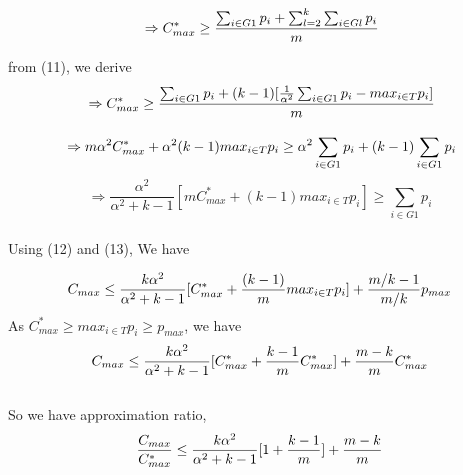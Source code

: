 \documentclass[10pt, conference, compsocconf]{IEEEtran}
\begin{document}
\begin{equation}
{\nonumber}\Rightarrow C_{max}^{*} \geq  \frac{\sum_{i \in G1 }^{}{{p_{i}}}+ \sum_{l=2}^{k}\sum_{i \in Gl }^{}{{p_{i}}}}{m}
\end{equation}




from (11), we derive\\

\begin{equation}{\nonumber}
\Rightarrow C_{max}^{*} \geq  \frac{\sum_{i \in G1 }^{}{{p_{i}}}+ (k-1)[\frac{1}{\alpha^{2}}\sum_{i \in G1 }^{}{{p_{i}}}-  {max_{i \in T}}{{p_{i}}}]}{m}
\end{equation}

\begin{equation}{\nonumber}
\Rightarrow m\alpha^{2}C_{max}^{*} + \alpha^{2} (k-1){max_{i \in T}}{{p_{i}}} \geq  \alpha^{2}\sum_{i \in G1 }^{}{{p_{i}}}+ (k-1)\sum_{i \in G1 }^{}{{p_{i}}} 
\end{equation}
\begin{equation}
\Rightarrow\frac{\alpha^{2}}{\alpha^{2}+k-1}[m C_{max}^{*}+(k-1) {max_{i \in T}}{{p_{i}}}] \geq \sum_{i \in G1 }^{}{{p_{i}}}  
\end{equation}
\\
Using (12) and (13), We have

\begin{equation}{\nonumber}
C_{max} \leq \frac{k\alpha^{2}}{\alpha^{2}+k-1}[ C_{max}^{*}+\frac{(k-1)}{m} {max_{i \in T}}{{p_{i}}}] + {\frac{m/k-1}{m/k}} p_{max} 
\end{equation}
 As $C_{max}^{*}\geq {{max_{i \in T}}{p_{i}}}\geq p_{max}$, we have\\
\begin{equation}{\nonumber}
 C_{max} \leq \frac{k\alpha^{2}}{\alpha^{2}+k-1}[ C_{max}^{*}+ {\frac{k-1}{m}}{C_{max}^{*}}] + {\frac{m-k}{m}} C_{max}^{*} \end{equation} \\
 

 
 So we have approximation ratio,\\
 \begin{equation}{\nonumber}
\frac{C_{max}}{C_{max}^{*}} \leq \frac{k\alpha^{2}}{\alpha^{2}+k-1}[1+ {\frac{k-1}{m}} ]+ {\frac{m-k}{m}} \end{equation}
\end{document}
